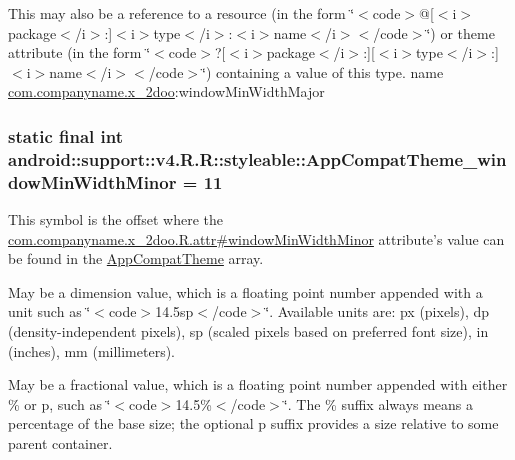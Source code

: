 This may also be a reference to a resource (in the form \char`\"{}$<$code$>$@\mbox{[}$<$i$>$package$<$/i$>$:\mbox{]}$<$i$>$type$<$/i$>$:$<$i$>$name$<$/i$>$$<$/code$>$\char`\"{}) or theme attribute (in the form \char`\"{}$<$code$>$?\mbox{[}$<$i$>$package$<$/i$>$:\mbox{]}\mbox{[}$<$i$>$type$<$/i$>$:\mbox{]}$<$i$>$name$<$/i$>$$<$/code$>$\char`\"{}) containing a value of this type.  name \hyperlink{namespacecom_1_1companyname_1_1x__2doo}{com.companyname.x\_\-2doo}:windowMinWidthMajor \hypertarget{classandroid_1_1support_1_1v4_1_1_r_1_1styleable_43bc5686bdcae44e39f9c6bac931d7ea}{
\subsubsection[{AppCompatTheme\_\-windowMinWidthMinor}]{\setlength{\rightskip}{0pt plus 5cm}static final int android::support::v4.R.R::styleable::AppCompatTheme\_\-windowMinWidthMinor = 11}}
\label{classandroid_1_1support_1_1v4_1_1_r_1_1styleable_43bc5686bdcae44e39f9c6bac931d7ea}


This symbol is the offset where the \hyperlink{classcom_1_1companyname_1_1x__2doo_1_1_r_1_1attr_c079db34365f9882cedca130639fb4a4}{com.companyname.x\_\-2doo.R.attr\#windowMinWidthMinor} attribute's value can be found in the \hyperlink{classandroid_1_1support_1_1v4_1_1_r_1_1styleable_0873e92ba21076bb5a4aeadeb7f5779f}{AppCompatTheme} array.

May be a dimension value, which is a floating point number appended with a unit such as \char`\"{}$<$code$>$14.5sp$<$/code$>$\char`\"{}. Available units are: px (pixels), dp (density-independent pixels), sp (scaled pixels based on preferred font size), in (inches), mm (millimeters). 

May be a fractional value, which is a floating point number appended with either \% or p, such as \char`\"{}$<$code$>$14.5\%$<$/code$>$\char`\"{}. The \% suffix always means a percentage of the base size; the optional p suffix provides a size relative to some parent container. 

